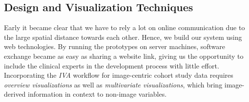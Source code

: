 \documentclass[journal]{style/vgtc} 			          %
\begin{document}
\subsection{Design and Visualization Techniques} \label{Structure and Workflow}
Early it became clear that we have to rely a lot on online communication due to the large spatial distance towards each other.
%
Hence, we build our system using web technologies. %
%
By running the prototypes on server machines, software exchange became as easy as sharing a website link, giving us the opportunity to include the clinical experts in the development process with little effort.
%
Incorporating the \emph{IVA} workflow for image-centric cohort study data requires \emph{overview visualizations} as well as \emph{multivariate visualizations}, which bring image-derived information in context to non-image variables.
\end{document}
